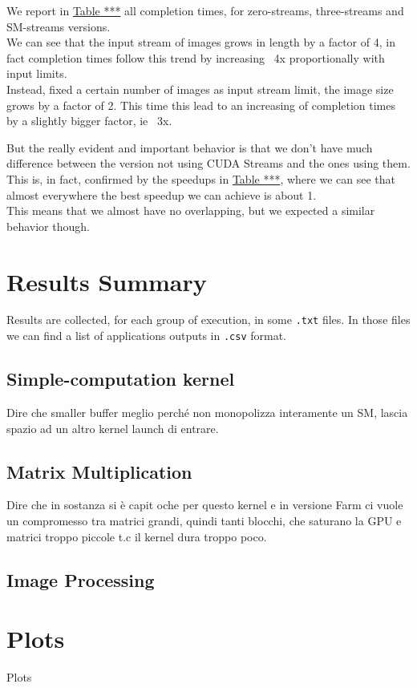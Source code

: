 We report in \hyperref[tab:imgdata]{Table ***} all completion times, for zero-streams, three-streams and SM-streams versions.\\
We can see that the input stream of images grows in length by a factor of 4, in fact completion times follow this trend by increasing ~4x proportionally with input limits.\\
Instead, fixed a certain number of images as input stream limit, the image size grows by a factor of 2. This time this lead to an increasing of completion times by a slightly bigger factor, ie ~3x.

But the really evident and important behavior is that we don't have much difference between the version not using CUDA Streams and the ones using them.\\
This is, in fact, confirmed by the speedups in \hyperref[tab:imgdata]{Table ***}, where we can see that almost everywhere the best speedup we can achieve is about 1.\\
This means that we almost have no overlapping, but we expected a similar behavior though.\\










\section{Results Summary}
Results are collected, for each group of execution, in some \texttt{.txt} files. In those files we can find a list of applications outputs in \texttt{.csv} format.

\subsection{Simple-computation kernel}
Dire che smaller buffer meglio perché non monopolizza interamente un SM, lascia spazio ad un altro kernel launch di entrare.

\subsection{Matrix Multiplication}
Dire che in sostanza si è capit oche per questo kernel e in versione Farm ci vuole un compromesso tra matrici grandi, quindi tanti blocchi, che saturano la GPU e matrici troppo piccole t.c il kernel dura troppo poco.
\subsection{Image Processing}


\section{Plots}
Plots